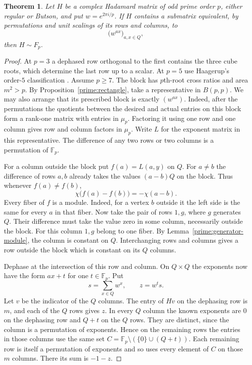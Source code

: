 \documentclass[11pt,a4paper]{article}
\newtheorem{theorem}{Theorem}[section]
\numberwithin{equation}{section}
\begin{document}
\begin{theorem}\label{prime:bare}
Let $H$ be a complex Hadamard matrix of odd prime order $p$, either regular or Butson, and put $w=e^{2\pi i/p}$. If $H$ contains a submatrix equivalent, by permutations and unit scalings of its rows and columns, to
$$\big(w^{ax}\big)_{a,x\in Q},$$
then $H\sim F_p$.
\end{theorem}
\begin{proof}
At $p=3$ a dephased row orthogonal to the first contains the three cube roots, which determine the last row up to a scalar. At $p=5$ use Haagerup's order-$5$ classification \cite{ha1}. Assume $p\ge7$. The block has $p$th-root cross ratios and area $m^2>p$. By Proposition~\ref{prime:rectangle}, take a representative in $B(p,p)$. We may also arrange that its prescribed block is exactly $(w^{ax})$. Indeed, after the permutations the quotients between the desired and actual entries on this block form a rank-one matrix with entries in $\mu_p$. Factoring it using one row and one column gives row and column factors in $\mu_p$. Write $L$ for the exponent matrix in this representative. The difference of any two rows or two columns is a permutation of $\mathbb F_p$.

For a column outside the block put $f(a)=L(a,y)$ on $Q$. For $a\ne b$ the difference of rows $a,b$ already takes the values $(a-b)Q$ on the block. Thus whenever $f(a)\ne f(b)$,
$$\chi\big(f(a)-f(b)\big)=-\chi(a-b).$$
Every fiber of $f$ is a module. Indeed, for a vertex $b$ outside it the left side is the same for every $a$ in that fiber. Now take the pair of rows $1,g$, where $g$ generates $Q$. Their difference must take the value zero in some column, necessarily outside the block. For this column $1,g$ belong to one fiber. By Lemma~\ref{prime:generator-module}, the column is constant on $Q$. Interchanging rows and columns gives a row outside the block which is constant on its $Q$ columns.

Dephase at the intersection of this row and column. On $Q\times Q$ the exponents now have the form $ax+t$ for one $t\in\mathbb F_p$. Put
$$s=\sum_{x\in Q}w^x,\qquad z=w^t s.$$
Let $v$ be the indicator of the $Q$ columns. The entry of $Hv$ on the dephasing row is $m$, and each of the $Q$ rows gives $z$. In every $Q$ column the known exponents are $0$ on the dephasing row and $Q+t$ on the $Q$ rows. They are distinct, since the column is a permutation of exponents. Hence on the remaining rows the entries in those columns use the same set $C=\mathbb F_p\setminus(\{0\}\cup(Q+t))$. Each remaining row is itself a permutation of exponents and so uses every element of $C$ on those $m$ columns. There its sum is $-1-z$.


\end{proof}
\end{document}
